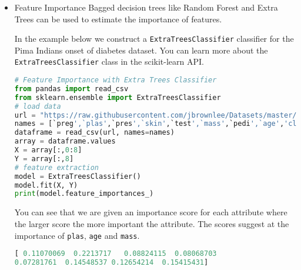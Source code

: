 \documentclass{book}
\begin{document}
\begin{itemize}
In the example below, we use PCA and select 3 principal components.
\begin{lstlisting}[language=Python]
# Feature Extraction with PCA
import numpy
from pandas import read_csv
from sklearn.decomposition import PCA
# load data
url = "https://raw.githubusercontent.com/jbrownlee/Datasets/master/pima-indians-diabetes.data.csv"
names = [`preg',`plas',`pres',`skin',`test',`mass',`pedi',`age','class']
dataframe = read_csv(url, names=names)
array = dataframe.values
X = array[:,0:8]
Y = array[:,8]
# feature extraction
pca = PCA(n_components=3)
fit = pca.fit(X)
# summarize components
print("Explained Variance: %s") % fit.explained_variance_ratio_
print(fit.components_)
\end{lstlisting}
You can see that the transformed dataset (3 principal components) bare little resemblance to the source data.
\begin{lstlisting}[language=Python]
Explained Variance: [ 0.88854663  0.06159078  0.02579012]
[[ -2.02176587e-03   9.78115765e-02   1.60930503e-02   6.07566861e-02
    9.93110844e-01   1.40108085e-02   5.37167919e-04  -3.56474430e-03]
 [  2.26488861e-02   9.72210040e-01   1.41909330e-01  -5.78614699e-02
   -9.46266913e-02   4.69729766e-02   8.16804621e-04   1.40168181e-01]
 [ -2.24649003e-02   1.43428710e-01  -9.22467192e-01  -3.07013055e-01
    2.09773019e-02  -1.32444542e-01  -6.39983017e-04  -1.25454310e-01]]
\end{lstlisting}
\item Feature Importance
Bagged decision trees like Random Forest and Extra Trees can be used to estimate the importance of features.

In the example below we construct a \texttt{ExtraTreesClassifier} classifier for the Pima Indians onset of diabetes dataset. You can learn more about the \texttt{ExtraTreesClassifier} class in the scikit-learn API.
\begin{lstlisting}[language=Python]
# Feature Importance with Extra Trees Classifier
from pandas import read_csv
from sklearn.ensemble import ExtraTreesClassifier
# load data
url = "https://raw.githubusercontent.com/jbrownlee/Datasets/master/pima-indians-diabetes.data.csv"
names = [`preg',`plas',`pres',`skin',`test',`mass',`pedi',`age','class']
dataframe = read_csv(url, names=names)
array = dataframe.values
X = array[:,0:8]
Y = array[:,8]
# feature extraction
model = ExtraTreesClassifier()
model.fit(X, Y)
print(model.feature_importances_)
\end{lstlisting}
You can see that we are given an importance score for each attribute where the larger score the more important the attribute. The scores suggest at the importance of \texttt{plas}, \texttt{age} and \texttt{mass}.
\begin{lstlisting}[language=Python]
[ 0.11070069  0.2213717   0.08824115  0.08068703  
0.07281761  0.14548537 0.12654214  0.15415431]
\end{lstlisting}
\end{itemize}
\end{document}

